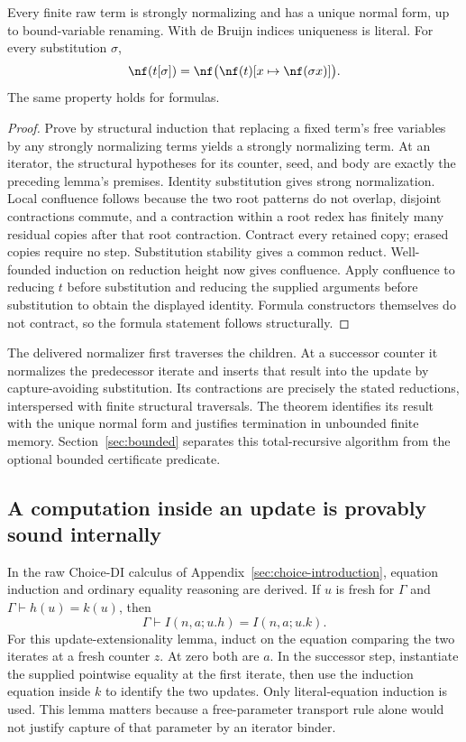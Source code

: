 \begin{theorem}
Every finite raw term is strongly normalizing and has a unique normal form,
up to bound-variable renaming. With de Bruijn indices uniqueness is literal.
For every substitution $\sigma$,
\[
 \nf(t[\sigma])=
 \nf\bigl(\nf(t)[x\mapsto\nf(\sigma x)]\bigr).
\]
The same property holds for formulas.
\end{theorem}
\begin{proof}
Prove by structural induction that replacing a fixed term's free variables
by any strongly normalizing terms yields a strongly normalizing term. At an
iterator, the structural hypotheses for its counter, seed, and body are
exactly the preceding lemma's premises. Identity substitution gives strong
normalization. Local confluence follows because the two root patterns do
not overlap, disjoint contractions commute, and a contraction within a root
redex has finitely many residual copies after that root contraction. Contract
every retained copy; erased copies require no step. Substitution stability
gives a common reduct. Well-founded induction on reduction height now gives
confluence. Apply confluence to reducing $t$ before substitution and reducing
the supplied arguments before substitution to obtain the displayed identity.
Formula constructors themselves do not contract, so the formula statement
follows structurally.
\end{proof}

The delivered normalizer first traverses the children. At a successor
counter it normalizes the predecessor iterate and inserts that result into
the update by capture-avoiding substitution. Its contractions are precisely
the stated reductions, interspersed with finite structural traversals.
The theorem identifies its result with the unique normal form and justifies
termination in unbounded finite memory. Section~\ref{sec:bounded} separates
this total-recursive algorithm from the optional bounded certificate predicate.

\subsection{A computation inside an update is provably sound internally}

In the raw Choice-DI calculus of Appendix~\ref{sec:choice-introduction},
equation induction and ordinary equality reasoning are derived. If $u$ is
fresh for $\Gamma$ and $\Gamma\vdash h(u)=k(u)$, then
\[
 \Gamma\vdash I(n,a;u.h)=I(n,a;u.k).
\]
For this update-extensionality lemma, induct on the equation comparing the
two iterates at a fresh counter $z$. At zero both are $a$. In the successor
step, instantiate the supplied pointwise equality at the first iterate,
then use the induction equation inside $k$ to identify the two updates.
Only literal-equation induction is used. This lemma matters because a
free-parameter transport rule alone would not justify capture of that
parameter by an iterator binder.

